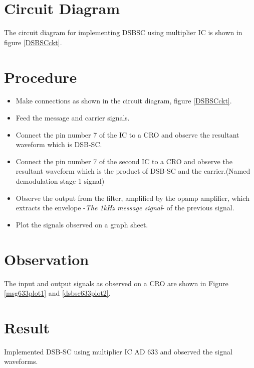 \section*{Circuit Diagram}
The circuit diagram for implementing DSBSC using multiplier IC is shown in figure \ref{DSBSCckt}.




\section*{Procedure}
\begin{itemize}
\item
Make connections as shown in the circuit diagram, figure \ref{DSBSCckt}.
\item
Feed the message and carrier signals.
\item
Connect the pin number 7 of the IC to a CRO and observe the resultant waveform which is DSB-SC.
\item
Connect the pin number 7 of the second IC to a CRO and observe the resultant waveform which is the product of DSB-SC and the carrier.(Named demodulation stage-1 signal)
\item
Observe the output from the filter, amplified by the opamp amplifier, which extracts the envelope -\emph{The 1kHz message signal}- of the previous signal.
\item
Plot the signals observed on a graph sheet.
\end{itemize}
\section*{Observation}



The input and output signals as observed on a CRO are shown in Figure \ref{msg633plot1} and \ref{dsbsc633plot2}.


\section*{Result}
Implemented DSB-SC using multiplier IC AD 633 and observed the signal waveforms.
